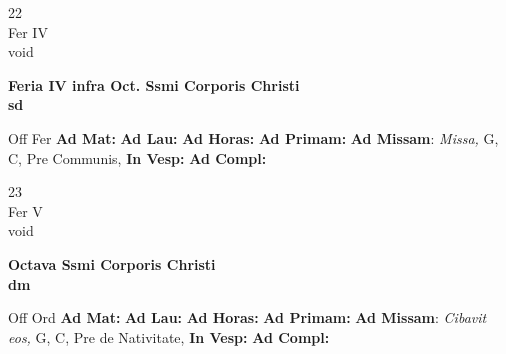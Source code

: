 \documentclass[10pt, openany]{book}
\begin{document}
    \begin{center}
        \begin{minipage}{3.5in}
            \vspace{2em}
            \begin{minipage}{0.5in}
                {\Huge 22} \\
                {\normalsize Fer IV} \\
                {\normalsize void}
            \end{minipage}
            \begin{minipage}{3.0in}
                \textbf{ \large Feria IV infra Oct. Ssmi Corporis Christi \\
                \textnormal{\normalsize sd}} \\ 
            \end{minipage}
            \begin{justify}Off Fer
                \textbf{Ad Mat: }
                \textbf{Ad Lau: }
                \textbf{Ad Horas: }
                \textbf{Ad Primam: }\textbf{Ad Missam}: \textit{Missa,} G, C, Pre Communis,  
                \textbf{In Vesp: }
                \textbf{Ad Compl: }
            \end{justify}
        \end{minipage}
    \end{center}

    \begin{center}
        \begin{minipage}{3.5in}
            \vspace{2em}
            \begin{minipage}{0.5in}
                {\Huge 23} \\
                {\normalsize Fer V} \\
                {\normalsize void}
            \end{minipage}
            \begin{minipage}{3.0in}
                \textbf{ \large Octava Ssmi Corporis Christi \\
                \textnormal{\normalsize dm}} \\ 
            \end{minipage}
            \begin{justify}Off Ord
                \textbf{Ad Mat: }
                \textbf{Ad Lau: }
                \textbf{Ad Horas: }
                \textbf{Ad Primam: }\textbf{Ad Missam}: \textit{Cibavit eos,} G, C, Pre de Nativitate,  
                \textbf{In Vesp: }
                \textbf{Ad Compl: }
            \end{justify}
        \end{minipage}
    \end{center}
\end{document}

